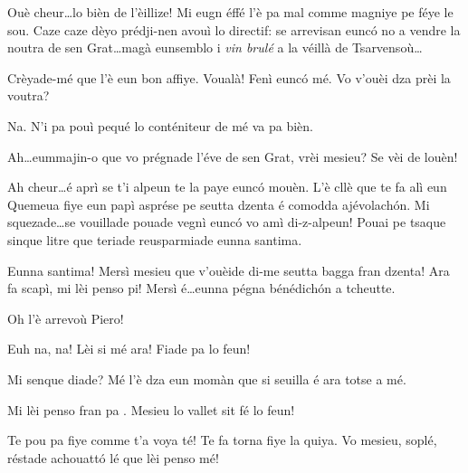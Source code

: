 \begin{drama}
\Pierluigispeaks Ouè cheur\ldots lo bièn de l'èillize! Mi eugn éffé l'è pa mal comme magniye pe féye le sou. Caze caze dèyo prédji-nen avouì lo directif: se arrevisan eunc\'o no a vendre la noutra de sen Grat\ldots magà eunsemblo i \textit{vin brulé} a la véillà de Tsarvensoù\ldots

\Seurspeaks Crèyade-mé que l'è eun bon affiye. Voualà! Fenì eunc\'o mé. Vo v'ouèi dza prèi la voutra?

\Pierluigispeaks Na. N'i pa pouì pequé lo conténiteur de mé  va pa bièn.

\Seurspeaks Ah\ldots eummajin-o que vo prégnade l'éve de sen Grat, vrèi mesieu? Se vèi de louèn!

\Pierluigispeaks Ah cheur\ldots é aprì se t'i alpeun te la paye eunc\'o mouèn. L'è cllè que te fa alì eun Quemeua fiye eun papì asprése pe seutta dzenta é comodda ajévolach\'on. Mi squezade\ldots se vou\-illa\-de pouade vegnì eunc\'o vo amì di-z-alpeun! Pouai pe tsaque sinque litre que teriade reusparmiade eunna santima.

\Seurspeaks{}  Eunna santima! Mersì mesieu que v'ouèide di-me seutta bagga fran dzenta! Ara fa scapì, mi lèi penso pi! Mersì é\ldots eunna pégna bénédich\'on a tcheutte.


\scene[-- Prospero]


\Pierluigispeaks{} Oh l'è arrevoù Piero!


\Prosperospeaks{} Euh na, na! Lèi si mé ara! Fiade pa lo feun!

\Pierluigispeaks Mi senque diade? Mé l'è dza eun momàn que si seuilla é ara totse a mé.

\Prosperospeaks Mi lèi penso fran pa \arrabbiato. Mesieu lo vallet sit fé lo feun!


\Valletspeaks {} Te pou pa fiye comme t'a voya té! Te fa torna fiye la quiya.  Vo mesieu, soplé, réstade achouatt\'o lé que lèi penso mé!


\end{drama}
